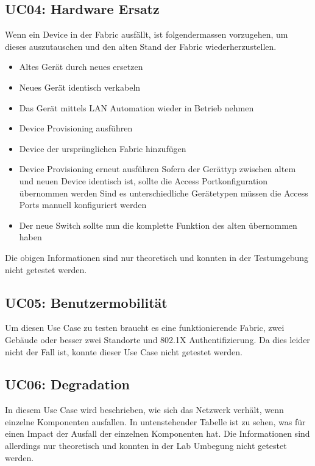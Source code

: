 \begin{landscape}
\subsection{UC04: Hardware Ersatz}
Wenn ein Device in der Fabric ausfällt, ist folgendermassen vorzugehen, um dieses auszutauschen und den alten Stand der Fabric wiederherzustellen.\\
\begin{itemize}
	\item Altes Gerät durch neues ersetzen
	\item Neues Gerät identisch verkabeln
	\item Das Gerät mittels LAN Automation wieder in Betrieb nehmen
	\item Device Provisioning ausführen
	\item Device der ursprünglichen Fabric hinzufügen
	\item Device Provisioning erneut ausführen
	\subitem Sofern der Gerättyp zwischen altem und neuen Device identisch ist, sollte die Access Portkonfiguration übernommen werden
	\subitem Sind es unterschiedliche Gerätetypen müssen die Access Ports manuell konfiguriert werden
	\item Der neue Switch sollte nun die komplette Funktion des alten übernommen haben\\
\end{itemize}

Die obigen Informationen sind nur theoretisch und konnten in der Testumgebung nicht getestet werden.
\pagebreak


\subsection{UC05: Benutzermobilität}
Um diesen Use Case zu testen braucht es eine funktionierende Fabric, zwei Gebäude oder besser zwei Standorte und 802.1X Authentifizierung. Da dies leider nicht der Fall ist, konnte dieser Use Case nicht getestet werden. 

\pagebreak
\subsection{UC06: Degradation}
In diesem Use Case wird beschrieben, wie sich das Netzwerk verhält, wenn einzelne Komponenten ausfallen. In untenstehender Tabelle ist zu sehen, was für einen Impact der Ausfall der einzelnen Komponenten hat. Die Informationen sind allerdings nur theoretisch und konnten in der Lab Umbegung nicht getestet werden.
\\


\end{landscape}
